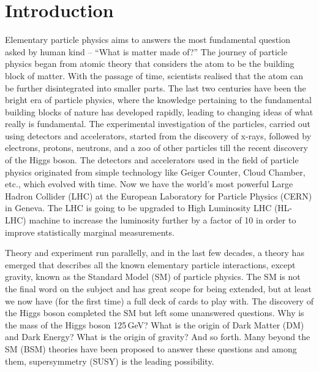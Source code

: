 \graphicspath{{chapt_dutch/}{intro/}{chapt2/}{chapt3/}{chapt4/}{chapt5/}{chapt6/}{chapt7/}{chapt8/}{chapt9/}}

\renewcommand\evenpagerightmark{{\scshape\small Chapter 1}}
\renewcommand\oddpageleftmark{{\scshape\small Introduction}}

\renewcommand{\bibname}{References}

\hyphenation{}

\chapter[Introduction]%
{Introduction}\label{chap:intro}
Elementary particle physics aims to answers the most fundamental question asked by human kind – ``What is matter made of?” The journey of particle physics began from atomic theory that considers the atom to be the building block of matter. With the passage of time, scientists realised that the atom can be further disintegrated into smaller parts. The last two centuries have been the bright era of particle physics, where the knowledge pertaining to the fundamental building blocks of nature has developed rapidly, leading to changing ideas of what really is fundamental. The experimental investigation of the particles, carried out using detectors and accelerators, started from the discovery of x-rays, followed by electrons, protons, neutrons, and a zoo of other particles till the recent discovery of the Higgs boson. The detectors and accelerators used in the field of particle physics originated from simple technology like Geiger Counter, Cloud Chamber, etc., which evolved with time. Now we have the world's most powerful Large Hadron Collider (LHC) at the European Laboratory for Particle Physics (CERN) in Geneva. The LHC is going to be upgraded to High Luminosity LHC (HL-LHC) machine to increase the luminosity further by a factor of 10 in order to improve statistically marginal measurements.  
 
Theory and experiment run parallelly, and in the last few decades, a theory has emerged that describes all the known elementary particle interactions, except gravity, known as the Standard Model (SM) of particle physics. The SM is not the final word on the subject and has great scope for being extended, but at least we now have (for the first time) a full deck of cards to play with. The discovery of the Higgs boson completed the SM but left some unanswered questions. Why is the mass of the Higgs boson 125\,GeV? What is the origin of Dark Matter (DM) and Dark Energy? What is the origin of gravity? And so forth. Many beyond the SM (BSM) theories have been proposed to answer these questions and among them, supersymmetry (SUSY) is the leading possibility.

